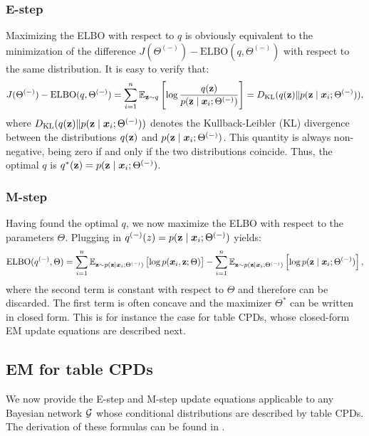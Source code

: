 \subsubsection{E-step}
\label{sec:e_step}
Maximizing the ELBO with respect to $q$ is obviously equivalent to the minimization of the difference $J(\Theta^{(-)}) - \mathrm{ELBO}(q, \Theta^{(-)})$ with respect to the same distribution. It is easy to verify that:
\begin{equation}
    J(\Theta^{(-)}) - \mathrm{ELBO}(q, \Theta^{(-)}) = \sum_{i=1}^n \mathbb{E}_{{\mathbf{z}} \sim q} \left[ \log \frac{q({\mathbf{z}})}{p({\mathbf{z}} \mid {\bm{x}}_i; \Theta^{(-)})} \right] = D_{\mathrm{KL}}(q({\mathbf{z}}) \Vert p({\mathbf{z}} \mid {\bm{x}}_i; \Theta^{(-)})),
\end{equation}
where $D_{\mathrm{KL}}(q({\mathbf{z}}) \Vert p({\mathbf{z}} \mid {\bm{x}}_i; \Theta^{(-)}))$ denotes the Kullback-Leibler (KL) divergence between the distributions $q({\mathbf{z}})$ and $p({\mathbf{z}} \mid {\bm{x}}_i; \Theta^{(-)})$. This quantity is always non-negative, being zero if and only if the two distributions coincide. Thus, the optimal $q$ is $q^*({\mathbf{z}}) = p({\mathbf{z}} \mid {\bm{x}}_i; \Theta^{(-)})$.

\subsubsection{M-step}
\label{sec:m_step}
Having found the optimal $q$, we now maximize the ELBO with respect to the parameters $\Theta$. Plugging in $q^{(-)}(z) = p({\mathbf{z}} \mid {\bm{x}}_i; \Theta^{(-)})$ yields:
\begin{equation}
    \mathrm{ELBO}(q^{(-)}, \Theta) = \sum_{i=1}^n \mathbb{E}_{{\mathbf{z}} \sim p({\mathbf{z}} \mid {\bm{x}}_i; \Theta^{(-)})} \left[ \log p({\bm{x}}_i, {\mathbf{z}}; \Theta) \right] - \sum_{i=1}^n \mathbb{E}_{{\mathbf{z}} \sim p({\mathbf{z}} \mid {\bm{x}}_i; \Theta^{(-)})} \left[ \log p({\mathbf{z}} \mid {\bm{x}}_i; \Theta^{(-)}) \right],
\end{equation}
where the second term is constant with respect to $\Theta$ and therefore can be discarded. The first term is often concave and the maximizer $\Theta^*$ can be written in closed form. This is for instance the case for table CPDs, whose closed-form EM update equations are described next.

\subsection{EM for table CPDs}
\label{sec:em_table_cpd}
We now provide the E-step and M-step update equations applicable to any Bayesian network ${\mathcal{G}}$ whose conditional distributions are described by table CPDs. The derivation of these formulas can be found in \citet{Koller2009}.

